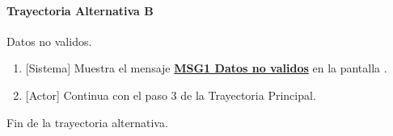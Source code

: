 \paragraph{Trayectoria Alternativa B} \label{W-PR-CU1.2:TB}
	Datos no validos.
	\begin{enumerate}[label=B\arabic*.]
		\item {[Sistema]} Muestra el mensaje \hyperref[MSG1]{\bf MSG1 Datos no validos} en la pantalla \textbf{}.
		\item {[Actor]} Continua con el paso 3 de la Trayectoria Principal.
	\end{enumerate}
	Fin de la trayectoria alternativa.